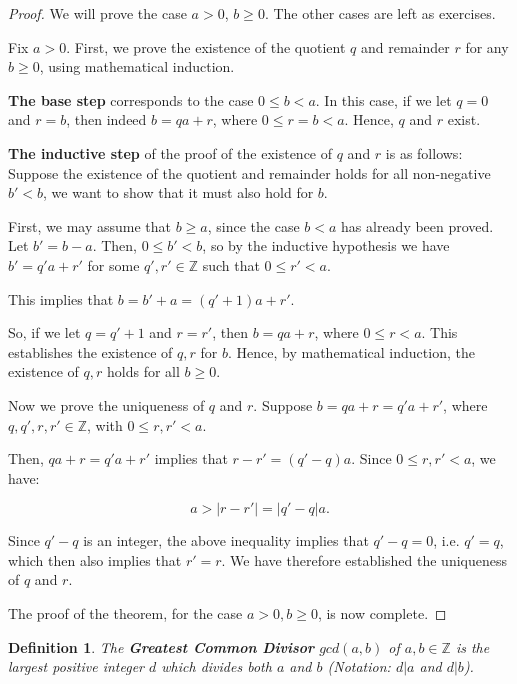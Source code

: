 \documentclass[a4paper,12pt]{report}
\newcommand{\abs}[1]{\left|#1\right|}
\newcounter{statement}
\numberwithin{statement}{chapter}
\newtheorem{defn}[statement]{Definition}
\numberwithin{equation}{chapter}
\numberwithin{section}{chapter}
\numberwithin{subsection}{section}
\begin{document}
\begin{proof}

We will prove the case $a > 0$, $b \geq 0$.  The other cases are left as exercises.


Fix $a > 0$.
First, we prove the existence of the quotient $q$ and remainder $r$ for any $b \geq 0$,
using mathematical induction.


 {\bf The base step}  corresponds to the case $0 \leq b < a$.
In this case, if we let $q = 0$ and $r = b$, then indeed $b = qa + r$, 
where $0 \leq r  = b < a$.  Hence, $q$ and $r$ exist.


 {\bf The inductive step}  of the proof of the existence of $q$ and $r$ is as follows: 
Suppose the existence of the quotient and remainder holds for all non-negative $b' < b$,
we want to show that it must also hold for $b$.  


First, we may assume that
$b \geq a$, since the case $b < a$ has already been proved.  Let $b' = b - a$.
Then, $0 \leq b' < b$,
so by the inductive hypothesis we have $b' = q'a + r'$ 
for some $q', r' \in \mathbb{Z}$ such that $0 \leq r' < a$.


This implies that $b = b' + a = (q' + 1)a + r'$.  


So, if we let $q = q'+ 1$
and $r = r'$, then $b = qa + r$, where $0 \leq r < a$.
This establishes the existence of $q, r$ for $b$.  
Hence, by mathematical induction, the existence of $q, r$ holds for all $b \geq 0$.


Now we prove the uniqueness of $q$ and $r$.
Suppose $b = qa + r = q'a + r'$, where $q, q', r, r' \in \mathbb{Z}$, 
with $0 \leq r, r' < a$.


Then, $qa+ r = q'a+r'$ implies that $r - r' = (q' - q)a$.
Since $0 \leq r, r' < a$, we have:


\[
a > \abs{r - r'} = \abs{q' - q} a.
\]


Since $q' - q$ is an integer, the above inequality implies that $q'  - q = 0$,
i.e. $q' = q$, which then also implies that $r' = r$.
We have therefore established the uniqueness of $q$ and $r$.



The proof of the theorem, for the case $a > 0, b \geq 0$, is now complete.


\end{proof}







\begin{defn}
The  {\bf Greatest Common Divisor}  $gcd(a, b)$ of $a, b \in \mathbb{Z}$ is the largest positive integer
$d$ which divides both $a$ and $b$ (Notation: $d | a$ and $d | b$).
\end{defn}
\end{document}
